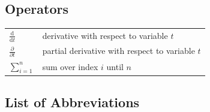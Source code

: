 \documentclass[english, 12pt, a4paper, elec, utf8, a-1b, online]{aaltothesis}
\begin{document}
\subsection*{Operators}
\begin{tabular}{ll}
$\displaystyle\frac{\mbox{d}}{\mbox{d} t}$ & derivative with respect to 
variable $t$\\[3mm]
$\displaystyle\frac{\partial}{\partial t}$  & partial derivative with respect 
to variable $t$ \\[3mm]
$\sum_{i=1}^{n}$                      & sum over index $i$ until $n$\\
\end{tabular}

\subsection*{List of Abbreviations}
\end{document}

